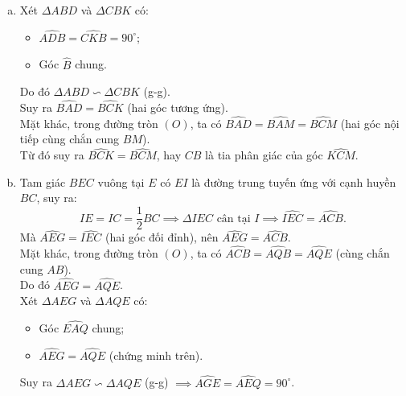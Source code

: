 \begin{bt}
{\begin{center}
\end{center}
\begin{enumerate}[a)]
	\item Xét $\Delta ABD$ và $\Delta CBK$ có:
	\begin{itemize}
		\item $\widehat{ADB} = \widehat{CKB} = 90^\circ$;
		\item Góc $\widehat{B}$ chung.
	\end{itemize}
	Do đó $\Delta ABD \backsim \Delta CBK$ (g-g).\\
	Suy ra $\widehat{BAD} = \widehat{BCK}$ (hai góc tương ứng).\\
	Mặt khác, trong đường tròn $(O)$, ta có $\widehat{BAD} = \widehat{BAM} = \widehat{BCM}$ (hai góc nội tiếp cùng chắn cung $BM$).\\
	Từ đó suy ra $\widehat{BCK} = \widehat{BCM}$, hay $CB$ là tia phân giác của góc $\widehat{KCM}$.
	\item Tam giác $BEC$ vuông tại $E$ có $EI$ là đường trung tuyến ứng với cạnh huyền $BC$, suy ra:
	$$IE = IC = \dfrac{1}{2}BC \implies \Delta IEC\text{ cân tại }I \implies \widehat{IEC} = \widehat{ACB}.$$
	Mà $\widehat{AEG} = \widehat{IEC}$ (hai góc đối đỉnh), nên $\widehat{AEG} = \widehat{ACB}$.\\
	Mặt khác, trong đường tròn $(O)$, ta có $\widehat{ACB} = \widehat{AQB} = \widehat{AQE}$ (cùng chắn cung $AB$).\\
	Do đó $\widehat{AEG} = \widehat{AQE}$.\\
	Xét $\Delta AEG$ và $\Delta AQE$ có:
	\begin{itemize}
		\item Góc $\widehat{EAQ}$ chung;
		\item $\widehat{AEG} = \widehat{AQE}$ (chứng minh trên).
	\end{itemize}
	Suy ra $\Delta AEG \backsim \Delta AQE$ (g-g) $\implies \widehat{AGE} = \widehat{AEQ} = 90^\circ$.\\

\end{enumerate}}
\end{bt}
